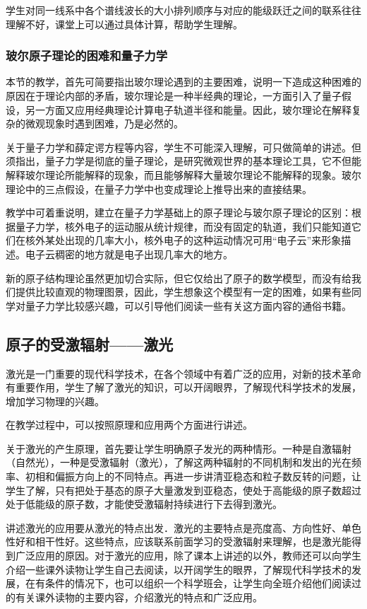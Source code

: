 学生对同一线系中各个谱线波长的大小排列顺序与对应的能级跃迁之间的联系往往理解不好，课堂上可以通过具体计算，帮助学生理解。

\subsubsection{玻尔原子理论的困难和量子力学}

本节的教学，首先可简要指出玻尔理论遇到的主要困难，说明一下造成这种困难的原因在于理论内部的矛盾，玻尔理论是一种半经典的理论，一方面引入了量子假设，另一方面又应用经典理论计算电子轨道半径和能量。因此，玻尔理论在解释复杂的微观现象时遇到困难，乃是必然的。

关于量子力学和薛定谔方程等内容，学生不可能深入理解，可只做简单的讲述。但须指出，量子力学是彻底的量子理论，是研究微观世界的基本理论工具，它不但能解释玻尔理论所能解释的现象，而且能够解释大量玻尔理论不能解释的现象。玻尔理论中的三点假设，在量子力学中也变成理论上推导出来的直接结果。

教学中可着重说明，建立在量子力学基础上的原子理论与玻尔原子理论的区别：根据量子力学，核外电子的运动服从统计规律，而没有固定的轨道，我们只能知道它们在核外某处出现的几率大小，核外电子的这种运动情况可用“电子云”来形象描述。电子云稠密的地方就是电子出现几率大的地方。

新的原子结构理论虽然更加切合实际，但它仅给出了原子的数学模型，而没有给我们提供比较直观的物理图景，因此，学生想象这个模型有一定的困难，如果有些同学对量子力学比较感兴趣，可以引导他们阅读一些有关这方面内容的通俗书籍。

\subsection{原子的受激辐射——激光}

激光是一门重要的现代科学技术，在各个领域中有着广泛的应用，对新的技术革命有重要作用，学生了解了激光的知识，可以开阔眼界，了解现代科学技术的发展，增加学习物理的兴趣。

在教学过程中，可以按照原理和应用两个方面进行讲述。

关于激光的产生原理，首先要让学生明确原子发光的两种情形。一种是自激辐射（自然光），一种是受激辐射（激光），了解这两种辐射的不同机制和发出的光在频率、初相和偏振方向上的不同特点。再进一步讲清亚稳态和粒子数反转的问题，让学生了解，只有把处于基态的原子大量激发到亚稳态，使处于高能级的原子数超过处于低能级的原子数，才能使受激辐射持续进行下去得到激光。

讲述激光的应用要从激光的特点出发．激光的主要特点是亮度高、方向性好、单色性好和相干性好。这些特点，应该联系前面学习的受激辐射来理解，也是激光能得到广泛应用的原因。对于激光的应用，除了课本上讲述的以外，教师还可以向学生介绍一些课外读物让学生自己去阅读，以开阔学生的眼界，了解现代科学技术的发展，在有条件的情况下，也可以组织一个科学班会，让学生向全班介绍他们阅读过的有关课外读物的主要内容，介绍激光的特点和广泛应用。

